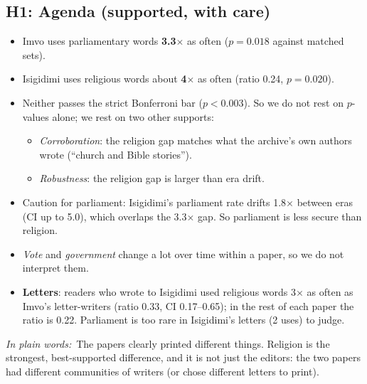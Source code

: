 \documentclass[11pt]{article}
\newcommand{\key}[1]{\textbf{#1}}
\newenvironment{plain}{\par\smallskip\noindent\begin{minipage}{\linewidth}\color{black!75}\small\textit{In plain words:}~}{\end{minipage}\par\smallskip}
\begin{document}
\subsection*{H1: Agenda (supported, with care)}
\begin{itemize}
\item Imvo uses parliamentary words \key{3.3$\times$} as often ($p=0.018$ against matched sets).
\item Isigidimi uses religious words about \key{4$\times$} as often (ratio 0.24, $p=0.020$).
\item Neither passes the strict Bonferroni bar ($p<0.003$). So we do not rest on $p$-values alone; we rest on two other supports:
 \begin{itemize}
 \item \emph{Corroboration}: the religion gap matches what the archive's own authors wrote (``church and Bible stories'').
 \item \emph{Robustness}: the religion gap is larger than era drift.
 \end{itemize}
\item Caution for parliament: Isigidimi's parliament rate drifts 1.8$\times$ between eras (CI up to 5.0), which overlaps the 3.3$\times$ gap. So parliament is less secure than religion.
\item \emph{Vote} and \emph{government} change a lot over time within a paper, so we do not interpret them.
\item \key{Letters}: readers who wrote to Isigidimi used religious words 3$\times$ as often as Imvo's letter-writers (ratio 0.33, CI 0.17--0.65); in the rest of each paper the ratio is 0.22. Parliament is too rare in Isigidimi's letters (2 uses) to judge.
\end{itemize}
\begin{plain}The papers clearly printed different things. Religion is the strongest, best-supported difference, and it is not just the editors: the two papers had different communities of writers (or chose different letters to print).\end{plain}
\end{document}
